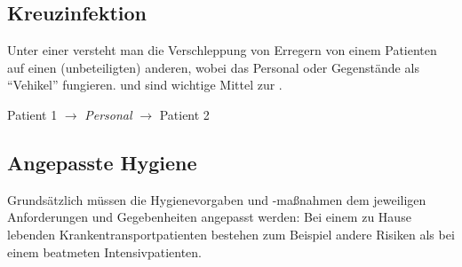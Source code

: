 \subsection{Kreuzinfektion}
\label{topic:kreuzinfektion}

{%
Unter einer  versteht man die
Verschleppung von Erregern von einem Patienten auf einen
(unbeteiligten) anderen, wobei das Personal oder Gegenstände
als \enquote{Vehikel} fungieren. 
und  sind wichtige
Mittel zur .

}{
Patient 1 ${\rightarrow}$ \emph{Personal} ${\rightarrow}$
Patient 2 }{}{}{}


\subsection{Angepasste Hygiene}

Grundsätzlich müssen die Hygienevorgaben und -maßnahmen dem
jeweiligen Anforderungen und Gegebenheiten
angepasst werden: Bei einem zu Hause lebenden
Krankentransportpatienten bestehen zum Beispiel andere
Risiken als bei einem beatmeten Intensivpatienten.

\TakeNotesLarge

